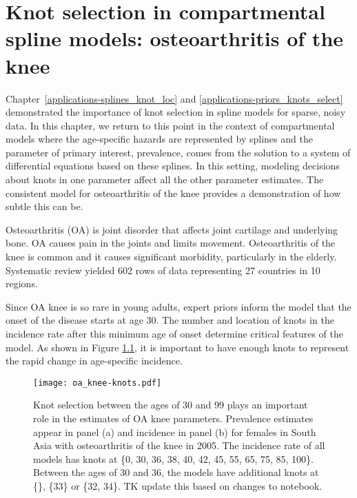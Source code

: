 \chapter{Knot selection in compartmental spline models: osteoarthritis of the knee}
\label{applications-con_fit_splines}

Chapter~\ref{applications-splines_knot_loc} and
\ref{applications-priors_knots_select} demonstrated the importance of
knot selection in spline models for sparse, noisy data. In this
chapter, we return to this point in the context of compartmental
models where the age-specific hazards are represented by splines and
the parameter of primary interest, prevalence, comes from the solution
to a system of differential equations based on these splines. In this
setting, modeling decisions about knots in one parameter affect all
the other parameter estimates.  The consistent model for
osteoarthritis of the knee provides a demonstration of how subtle this
can be.

Osteoarthritis (OA) is joint disorder that affects joint cartilage and
underlying bone.  OA causes pain in the joints and limits movement.
Osteoarthritis of the knee is common and it causes significant
morbidity, particularly in the
elderly. \cite{felson_epidemiology_1988, felson_incidence_1995}
Systematic review yielded 602 rows of data representing 27 countries
in 10 regions.

Since OA knee is so rare in young adults, expert priors inform the
model that the onset of the disease starts at age 30.  The number and
location of knots in the incidence rate after this minimum age of
onset determine critical features of the model. As shown in Figure
\ref{fig:app-oa knee knots}, it is important to have enough knots to
represent the rapid change in age-specific incidence.

    \begin{figure}[h]
        \begin{center}
            \texttt{[image: oa\_knee-knots.pdf]}
            \caption{Knot selection between the ages of 30 and 99
              plays an important role in the estimates of OA knee
              parameters.  Prevalence estimates appear
              in panel (a) and incidence in panel (b) for females in
              South Asia with osteoarthritis of the knee in 2005.  The
              incidence rate of all models has knots at \{0, 30, 36,
              38, 40, 42, 45, 55, 65, 75, 85, 100\}.  Between the ages
              of 30 and 36, the models have additional knots at \{\}, \{33\} 
              or \{32, 34\}. TK update this based on changes to notebook.}
            \label{fig:app-oa knee knots}
        \end{center}
    \end{figure}

